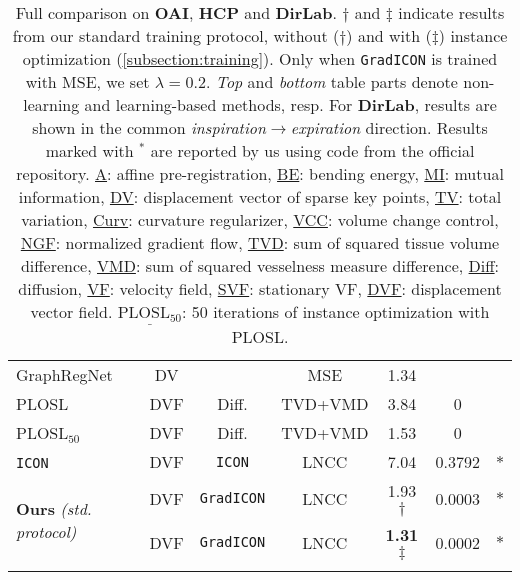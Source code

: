 \begin{table*}[b]
\begin{small}
\begin{tabular}{lcccccc}
			GraphRegNet~\cite{hansen2021graphregnet}              & DV                      & \textemdash                           & MSE         & 1.34\resTS                 & \textemdash       & ~\cite{hansen2021graphregnet}    \\
			PLOSL~\cite{wang2022PLOSL}                            & DVF                     & Diff.                                 & TVD+VMD     & 3.84\resTS                 & 0                 & ~\cite{wang2022PLOSL}            \\
			PLOSL$_{50}$~\cite{wang2022PLOSL}                     & DVF                     & Diff.                                 & TVD+VMD     & 1.53\resTS                 & 0                 & ~\cite{wang2022PLOSL}            \\
			\texttt{ICON}~\cite{greer2021icon}                    & DVF                     & \texttt{ICON}                         & LNCC        & 7.04\resTS                 & 0.3792            & $\ast$                           \\
			\multirow{2}{*}{\textbf{Ours} \emph{(std. protocol)}} & DVF                     & \cellcolor{black!10}\texttt{GradICON} & LNCC        & 1.93$\dagger$              & 0.0003            & $\ast$                           \\
			                                                      & DVF                     & \cellcolor{black!10}\texttt{GradICON} & LNCC        & \textbf{1.31}$\ddagger$    & 0.0002            & $\ast$                           \\
			\bottomrule\vspace{-5mm}
		\end{tabular}
		\caption{Full comparison on \textbf{OAI}, \textbf{HCP} and \textbf{DirLab}. $\dagger$ and $\ddagger$ indicate results from our standard training protocol, without ($\dagger$) and with ($\ddagger$) instance optimization (\ref{subsection:training}). Only when \texttt{GradICON} is trained with MSE, we set $\lambda=0.2$. \emph{Top} and \emph{bottom} table parts denote non-learning and learning-based methods, resp. For \textbf{DirLab}, results are shown in the common \emph{inspiration$\rightarrow$expiration} direction. Results marked with $^\ast$ are reported by us using code from the official repository. \underline{A}: affine pre-registration, \underline{BE}: bending energy, \underline{MI}: mutual information, \underline{DV}: displacement vector of sparse key points, \underline{TV}: total variation, \underline{Curv}: curvature regularizer, \underline{VCC}: volume change control, \underline{NGF}: normalized gradient flow, \underline{TVD}: sum of squared tissue volume difference, \underline{VMD}: sum of squared vesselness measure difference, \underline{Diff}: diffusion, \underline{VF}: velocity field, \underline{SVF}: stationary VF, \underline{DVF}: displacement vector field. $\underline{\text{PLOSL}_{50}}$: 50 iterations of instance optimization with PLOSL.}
		\label{tab:exp_real_datasets_full}
	\end{small}
\end{table*}
